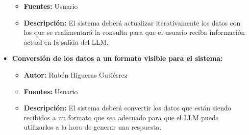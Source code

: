 \begin{itemize}
\begin{itemize}
        \item \textbf{Fuentes:} Usuario
        \item \textbf{Descripción:} El sistema deberá actualizar iterativamente los datos con los que se realimentará la consulta para que el usuario reciba información actual en la salida del LLM.
    \end{itemize}
    \item \textbf{Conversión de los datos a un formato visible para el sistema:}
    \begin{itemize}
        \item \textbf{Autor:} Rubén Higueras Gutiérrez
        \item \textbf{Fuentes:} Usuario
        \item \textbf{Descripción:} El sistema deberá convertir los datos que están siendo recibidos a un formato que sea adecuado para que el LLM pueda utilizarlos a la hora de generar una respuesta.
    \end{itemize}
\end{itemize}





